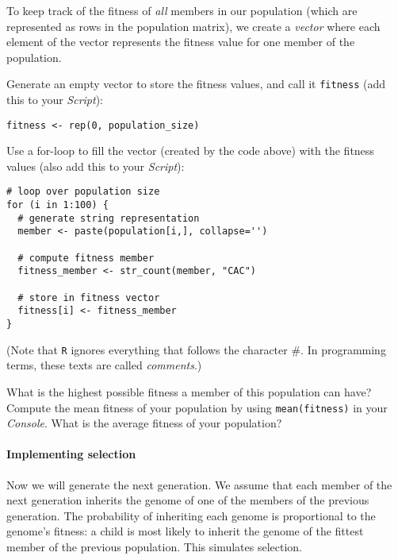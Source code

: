 \documentclass[a4paper, 9pt]{article}
\begin{document}
To keep track of the fitness of \textit{all} members in our population
(which are represented as rows in the population matrix), we create a
\textit{vector} where each element of the vector represents
the fitness value for one member of the population.

\begin{exercise}
    \action Generate an empty vector to store the fitness values, and call it \texttt{fitness} (add this to your \emph{Script}):
    \begin{lstlisting}
fitness <- rep(0, population_size)
    \end{lstlisting}
    \action Use a for-loop to fill the vector (created by the code above) with the fitness values (also add this to your \emph{Script}):
    \begin{lstlisting}[otherkeywords={str_count}]
# loop over population size
for (i in 1:100) {      
  # generate string representation
  member <- paste(population[i,], collapse='') 
  
  # compute fitness member   
  fitness_member <- str_count(member, "CAC")   
  
  # store in fitness vector
  fitness[i] <- fitness_member
}
\end{lstlisting}
    
    (Note that \texttt{R} ignores everything that follows the character \#. In programming terms, these texts are called \textit{comments}.)
    
    What is the highest possible fitness a member of this population can have?
    \action Compute the mean fitness of your population by using \verb|mean(fitness)| in your \emph{Console}.
    What is the average fitness of your population?
\end{exercise}

\paragraph{Implementing selection} Now we will generate the next generation. We assume that each member of
the next generation inherits the genome of one of the members of the
previous generation. The probability of inheriting each genome is
proportional to the genome's fitness: a child is most likely to inherit
the genome of the fittest member of the previous population. This
simulates selection.
\end{document}
